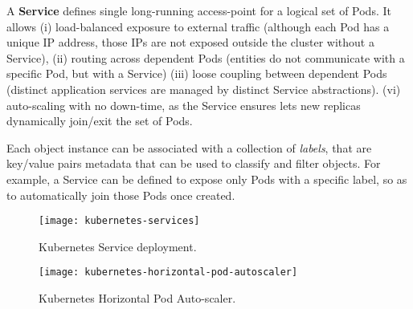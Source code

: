 %
%
%
%

A \textbf{Service} defines single long-running access-point for a logical set of Pods.
%
It allows
(i) load-balanced exposure to external traffic (although each Pod has a unique IP address, those IPs are not exposed outside the cluster without a Service),
(ii) routing across dependent Pods (entities do not communicate with a specific Pod, but with a Service)
(iii) loose coupling between dependent Pods (distinct application services are managed by distinct Service abstractions).
(vi) auto-scaling with no down-time, as the Service ensures lets new replicas dynamically join/exit the set of Pods.

Each object instance can be associated with a collection of \textit{labels}, that are key/value pairs metadata that can be used to classify and filter objects.
%
For example, a Service can be defined to expose only Pods with a specific label, so as to automatically join those Pods once created.

\begin{figure}	
	\label{fig:kubernetes-services}
	\centering
	\texttt{[image: kubernetes-services]}
	\caption{Kubernetes Service deployment.}
\end{figure}

\begin{figure}	
	\label{fig:kubernetes-horizontal-pod-autoscaler}
	\centering
	\texttt{[image: kubernetes-horizontal-pod-autoscaler]}
	\caption{Kubernetes Horizontal Pod Auto-scaler.}
\end{figure}

